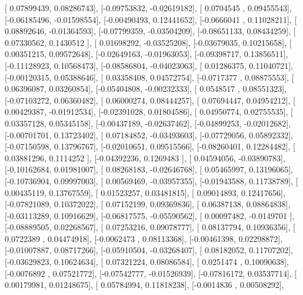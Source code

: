 \documentclass{article}
\begin{document}
       [ 0.07899439,  0.08286743],
       [-0.09753832, -0.02619182],
       [ 0.0704545 ,  0.09455543],
       [-0.06185496, -0.01598554],
       [-0.00490493,  0.12441652],
       [-0.0666041 ,  0.11028211],
       [ 0.08892646, -0.01364593],
       [-0.07799359, -0.03504209],
       [-0.08651133,  0.08434259],
       [ 0.07330562,  0.1430512 ],
       [ 0.01698292, -0.03525208],
       [-0.03679035,  0.10215658],
       [ 0.00351215,  0.09572648],
       [-0.02649163, -0.01963053],
       [-0.09398717,  0.13856511],
       [-0.11128923,  0.10568473],
       [-0.08586804, -0.04023063],
       [ 0.01286375,  0.11040721],
       [-0.00120315,  0.05388646],
       [ 0.03358408,  0.04572754],
       [-0.0717377 ,  0.08875553],
       [ 0.06396087,  0.03260854],
       [-0.05404808, -0.00232333],
       [ 0.0548517 ,  0.08551323],
       [-0.07103272,  0.06360482],
       [ 0.06000274,  0.08444257],
       [ 0.07694447,  0.04954212],
       [ 0.00429387, -0.01912534],
       [-0.02391028,  0.01804586],
       [ 0.04950774,  0.02755535],
       [ 0.03357128,  0.05345158],
       [-0.00437189, -0.02637462],
       [-0.04899253, -0.02012682],
       [-0.00701701,  0.13723402],
       [ 0.07184852, -0.03493603],
       [-0.07729056,  0.05892332],
       [-0.07150598,  0.13796767],
       [-0.02010651,  0.09515566],
       [-0.08260401,  0.12284482],
       [ 0.03881296,  0.1114252 ],
       [-0.04392236,  0.1269483 ],
       [ 0.04594056, -0.03890783],
       [-0.10162684,  0.01981007],
       [ 0.08268183, -0.02646768],
       [ 0.05465997,  0.13196065],
       [-0.10736904,  0.09997003],
       [ 0.00569469, -0.03957355],
       [-0.01943588,  0.11738789],
       [ 0.00435119,  0.13767559],
       [ 0.01523257,  0.03481815],
       [ 0.09014893,  0.12417656],
       [-0.07821089,  0.10372022],
       [ 0.07152199,  0.09369836],
       [ 0.06387138,  0.08864838],
       [-0.03113289,  0.10916629],
       [-0.06817575, -0.05590562],
       [ 0.00097482, -0.0149701 ],
       [-0.08889505,  0.02268567],
       [ 0.07253216,  0.09078777],
       [ 0.08137794,  0.10936356],
       [ 0.0722389 ,  0.04474918],
       [-0.0062473 ,  0.08113368],
       [-0.00461398,  0.02298872],
       [-0.01007887,  0.08717266],
       [-0.05910504, -0.03268407],
       [ 0.08182052,  0.11707202],
       [-0.03629823,  0.10624634],
       [ 0.07321224,  0.08086584],
       [ 0.0251474 ,  0.10090638],
       [-0.0076892 ,  0.07521772],
       [-0.07542777, -0.01526939],
       [-0.07816172,  0.03537714],
       [ 0.00179981,  0.01248675],
       [ 0.05784994,  0.11818238],
       [-0.0014836 ,  0.00508292],
\end{document}
